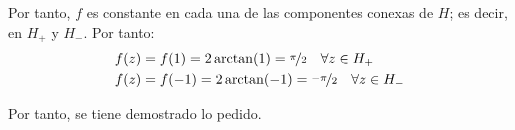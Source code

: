 \begin{ejercicio}
    Por tanto, $f$ es constante en cada una de las componentes conexas de $H$; es decir, en $H_+$ y $H_-$. Por tanto:
    \begin{align*}
        f(z) &= f(1)=2\arctan(1)=\nicefrac{\pi}{2} \quad \forall z\in H_+\\
        f(z) &= f(-1)=2\arctan(-1)=\nicefrac{-\pi}{2} \quad \forall z\in H_-
    \end{align*}

    Por tanto, se tiene demostrado lo pedido.
\end{ejercicio}